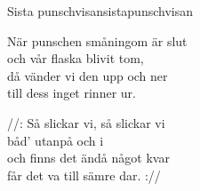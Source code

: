 \begin{song}{Sista punschvisan}{sistapunschvisan}
\begin{vers}
När punschen småningom är slut\\
och vår flaska blivit tom,\\
då vänder vi den upp och ner\\
till dess inget rinner ur.\\
\end{vers}
\begin{vers}
//: Så slickar vi, så slickar vi\\
båd' utanpå och i\\
och finns det ändå något kvar\\
får det va till sämre dar. ://\\
\end{vers}
\end{song}
